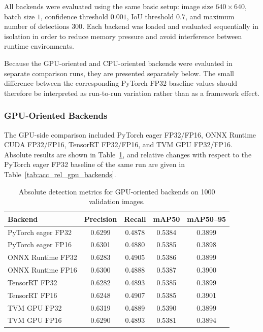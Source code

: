 \documentclass[12pt,a4paper]{report}
\begin{document}
All backends were evaluated using the same basic setup: image size $640 \times 640$, batch size $1$, confidence
threshold $0.001$, IoU threshold $0.7$, and maximum number of detections $300$. Each backend was loaded and evaluated
sequentially in isolation in order to reduce memory pressure and avoid interference between runtime environments.

Because the GPU-oriented and CPU-oriented backends were evaluated in separate comparison runs, they are presented
separately below. The small difference between the corresponding PyTorch FP32 baseline values should therefore be
interpreted as run-to-run variation rather than as a framework effect.

\subsubsection{GPU-Oriented Backends}

The GPU-side comparison included PyTorch eager FP32/FP16, ONNX Runtime CUDA FP32/FP16, TensorRT FP32/FP16, and
TVM GPU FP32/FP16. Absolute results are shown in Table~\ref{tab:acc_abs_gpu_backends}, and relative changes with
respect to the PyTorch eager FP32 baseline of the same run are given in Table~\ref{tab:acc_rel_gpu_backends}.

\begin{table}[ht]
\centering
\caption{Absolute detection metrics for GPU-oriented backends on 1000 validation images.}
\label{tab:acc_abs_gpu_backends}
\begin{tabular}{lcccc}
\toprule
Backend & Precision & Recall & mAP50 & mAP50--95 \\
\midrule
PyTorch eager FP32     & 0.6299 & 0.4878 & 0.5384 & 0.3899 \\
PyTorch eager FP16     & 0.6301 & 0.4880 & 0.5385 & 0.3898 \\
ONNX Runtime FP32      & 0.6283 & 0.4905 & 0.5386 & 0.3899 \\
ONNX Runtime FP16      & 0.6300 & 0.4888 & 0.5387 & 0.3900 \\
TensorRT FP32          & 0.6282 & 0.4893 & 0.5385 & 0.3899 \\
TensorRT FP16          & 0.6248 & 0.4907 & 0.5385 & 0.3901 \\
TVM GPU FP32           & 0.6319 & 0.4889 & 0.5390 & 0.3899 \\
TVM GPU FP16           & 0.6290 & 0.4893 & 0.5381 & 0.3894 \\
\bottomrule
\end{tabular}
\end{table}
\end{document}
